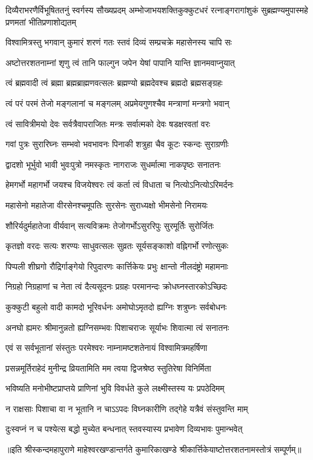 
{दिव्यैराभरणैर्विभूषिततनुं स्वर्गस्य सौख्यप्रदम्}
{अम्भोजाभयशक्तिकुक्कुटधरं रत्नाङ्गरागांशुकं}
{सुब्रह्मण्यमुपास्महे प्रणमतां भीतिप्रणाशोद्यतम्}

\twolineshloka
{विश्वामित्रस्तु भगवान् कुमारं शरणं गतः}
{स्तवं दिव्यं सम्प्रचक्रे महासेनस्य चापि सः}

\twolineshloka
{अष्टोत्तरशतनाम्नां शृणु त्वं तानि फाल्गुन}
{जपेन येषां पापानि यान्ति ज्ञानमवाप्नुयात्}

\twolineshloka
{त्वं ब्रह्मवादी त्वं ब्रह्मा ब्रह्मब्राह्मणवत्सलः}
{ब्रह्मण्यो ब्रह्मदेवश्च ब्रह्मदो ब्रह्मसङ्ग्रहः}

\twolineshloka
{त्वं परं परमं तेजो मङ्गलानां च मङ्गलम्}
{अप्रमेयगुणश्चैव मन्त्राणां मन्त्रगो भवान्}

\twolineshloka
{त्वं सावित्रीमयो देवः सर्वत्रैवापराजितः}
{मन्त्रः सर्वात्मको देवः षडक्षरवतां वरः}

\twolineshloka
{गवां पुत्रः सुरारिघ्नः सम्भवो भवभावनः}
{पिनाकी शत्रुहा चैव कूटः स्कन्दः सुराग्रणीः}

\twolineshloka
{द्वादशो भूर्भुवो भावी भुवःपुत्रो नमस्कृतः}
{नागराजः सुधर्मात्मा नाकपृष्ठः सनातनः}

\twolineshloka
{हेमगर्भो महागर्भो जयश्च विजयेश्वरः}
{त्वं कर्ता त्वं विधाता च नित्योऽनित्योऽरिमर्दनः}

\twolineshloka
{महासेनो महातेजा वीरसेनश्चमूपतिः}
{सुरसेनः सुराध्यक्षो भीमसेनो निरामयः}

\twolineshloka
{शौरिर्यदुर्महातेजा वीर्यवान् सत्यविक्रमः}
{तेजोगर्भोऽसुररिपुः सुरमूर्तिः सुरोर्जितः}

\twolineshloka
{कृतज्ञो वरदः सत्यः शरण्यः साधुवत्सलः}
{सुव्रतः सूर्यसङ्काशो वह्निगर्भो रणोत्सुकः}

\twolineshloka
{पिप्पली शीघ्रगो रौद्रिर्गाङ्गेयो रिपुदारणः}
{कार्त्तिकेयः प्रभुः क्षान्तो नीलदंष्ट्रो महामनाः}

\twolineshloka
{निग्रहो निग्रहाणां च नेता त्वं दैत्यसूदनः}
{प्रग्रहः परमानन्दः क्रोधघ्नस्तारकोऽच्छिदः}

\twolineshloka
{कुक्कुटी बहुलो वादी कामदो भूरिवर्धनः}
{अमोघोऽमृतदो ह्यग्निः शत्रुघ्नः सर्वबोधनः}

\twolineshloka
{अनघो ह्यमरः श्रीमानुन्नतो ह्यग्निसम्भवः}
{पिशाचराजः सूर्याभः शिवात्मा त्वं सनातनः}

\twolineshloka
{एवं स सर्वभूतानां संस्तुतः परमेश्वरः}
{नाम्नामष्टशतेनायं विश्वामित्रमहर्षिणा}

\twolineshloka
{प्रसन्नमूर्तिराहेदं मुनीन्द्र व्रियतामिति}
{मम त्वया द्विजश्रेष्ठ स्तुतिरेषा विनिर्मिता}

\twolineshloka
{भविष्यति मनोभीष्टप्राप्तये प्राणिनां भुवि}
{विवर्धते कुले लक्ष्मीस्तस्य यः प्रपठेदिमम्}

\twolineshloka
{न राक्षसाः पिशाचा वा न भूतानि न चाऽऽपदः}
{विघ्नकारीणि तद्गेहे यत्रैवं संस्तुवन्ति माम्}

\twolineshloka
{दुःस्वप्नं न च पश्येत्स बद्धो मुच्येत बन्धनात्}
{स्तवस्यास्य प्रभावेण दिव्यभावः पुमान्भवेत्}

{॥इति श्रीस्कन्दमहापुराणे माहेश्वरखण्डान्तर्गते कुमारिकाखण्डे श्रीकार्त्तिकेयाष्टोत्तरशतनामस्तोत्रं सम्पूर्णम्॥}